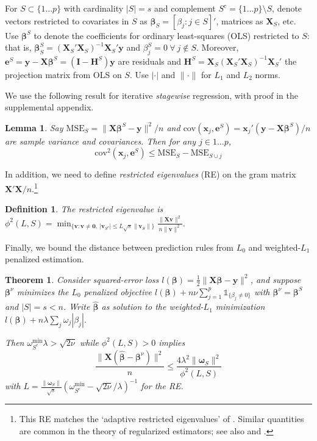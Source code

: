 \documentclass[twoside]{article}
\newtheorem{theorem}{\bf Theorem}[section]
\newtheorem{definition}{\bf Definition}[section]
\newtheorem{lemma}{\bf Lemma}[section]
\newcommand{\bs}[1]{\boldsymbol{#1}}
\newcommand{\mr}[1]{\mathrm{#1}}
\newcommand{\bm}[1]{\mathbf{#1}}
\newcommand{\ds}[1]{\mathds{#1}}
\begin{document}
 For  $S \subset \{1\ldots p\}$ with cardinality $|S|=s$ and complement $S^c =
\{1\ldots p\}\setminus S$, denote vectors restricted to covariates in $S$ as
$\bm{\beta}_S = [\beta_j:j\in S]'$, matrices as $\bm{X}_S$, etc.  Use
$\bs{\beta}^S$ to denote the coefficients for ordinary least-squares (OLS)
restricted to $S$: that is, $\bs{\beta}^S_S =
(\bm{X}_S'\bm{X}_S)^{-1}\bm{X}_S'\bm{y}$ and $\beta^{S}_j = 0~\forall~j\notin
S$.  Moreover, $\bm{e}^S = \bm{y}-\bm{X}\bs{\beta}^S =
(\bm{I}-\bm{H}^S)\bm{y}$ are residuals and $\bm{H}^S =
\bm{X}_S(\bm{X}_S'\bm{X}_S)^{-1}\bm{X}_S'$ the projection matrix from OLS on $S$.  
Use $|\cdot|$ and $\|\cdot\|$ for $L_1$ and $L_2$ norms.

We use the following result for iterative \textit{stagewise} regression, with proof in the supplemental appendix. 
\begin{lemma}\label{SSElemma}
Say $\mr{MSE}_S = \|\bm{X}\bs{\beta}^S-\bm{y}\|^2/n$ and 
$\mr{cov}(\bs{x}_j,\bm{e}^S) = \bs{x}_j'(\bm{y}-\bm{X}\bs{\beta}^S)/n$ are sample variance and covariances.  Then for any $j \in 1\ldots p$, 
\[
\mr{cov}^2(\bs{x}_j,\bm{e}^S) \leq \mr{MSE}_S - \mr{MSE}_{S\cup j}
\]
\end{lemma}

In addition, we need to define {\it restricted eigenvalues} (RE) on the gram matrix $\bm{X}'\bm{X}/n$.\footnote{
  This  RE  matches the `adaptive restricted eigenvalues' of \cite{buhlmann_statistics_2011}.  
Similar quantities are common in the theory of regularized estimators; see also
\cite{raskutti_restricted_2010} and  \cite{bickel_simultaneous_2009}.}

  
\begin{definition}\label{redef}
The restricted eigenvalue is
$
\phi^2(L,S) = \min_{\{\bm{v}: \bm{v}\neq \bm{0},~|\bm{v}_{S^c}| \leq L\sqrt{s}\|\bm{v}_S\|\}}\frac{\|\bm{X}\bm{v}\|^2}{n\|\bm{v}\|^2}$.
\end{definition}

Finally,  we bound the distance between prediction rules
from $L_0$ and weighted-$L_1$ penalized estimation.  

\begin{theorem} \label{thm:sparseapprox}  Consider squared-error loss
$l(\bs{\beta}) =
\frac{1}{2}\|\bm{X}\bs{\beta}-\bm{y}\|^2$, and suppose $\bs{\beta}^{\nu}$ minimizes the $L_0$ penalized objective $l(\bs{\beta}) + n\nu\sum_{j=1}^p\ds{1}_{\{\beta_j\neq0\}}$ with $\bs{\beta}^\nu = \bs{\beta}^S$ and $|S|=s<n$.   
Write $\bs{\hat\beta}$ as solution to the weighted-$L_1$ minimization $l(\bs{\beta}) + n\lambda\sum_j\omega_j|\beta_j|$. 

Then  
$\omega^{\mr{min}}_{S^c}\lambda > \sqrt{2\nu}$ while $\phi^2(L,S) > 0$ implies
\begin{equation} \label{sparseineq}
\frac{\|\bm{X}(\bs{\hat\beta}-\bs{\beta}^\nu)\|^2}{n}\leq
\frac{4\lambda^2 \|\bs{\omega}_S\|^2}{\phi^2(L, S)}
\end{equation} 
with 
 $L = \frac{\|\bs{\omega}_S\|}{\sqrt{s}}\left(\omega^{\mr{min}}_{S^c}-\sqrt{2\nu}/\lambda\right)^{-1}$ for the RE.
\end{theorem}
\end{document}

